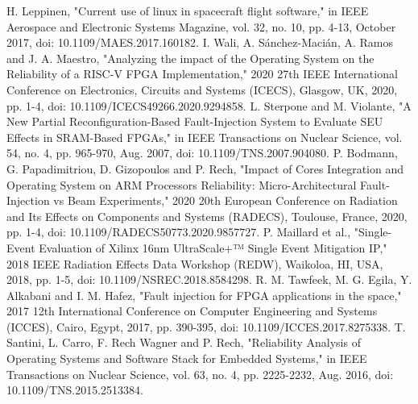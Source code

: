 \documentclass[conference]{IEEEtran}
\begin{document}
\begin{thebibliography}{10}
     H. Leppinen, "Current use of linux in spacecraft flight software," in IEEE Aerospace and Electronic Systems Magazine,
    vol. 32, no. 10, pp. 4-13, October 2017, doi: 10.1109/MAES.2017.160182. 
     I. Wali, A. Sánchez-Macián, A. Ramos and J. A. Maestro, "Analyzing the impact of the Operating System on the Reliability
    of a RISC-V FPGA Implementation," 2020 27th IEEE International Conference on Electronics, Circuits and Systems (ICECS), Glasgow, UK, 2020,
    pp. 1-4, doi: 10.1109/ICECS49266.2020.9294858.
     L. Sterpone and M. Violante, "A New Partial Reconfiguration-Based Fault-Injection System to Evaluate SEU Effects in SRAM-Based
    FPGAs," in IEEE Transactions on Nuclear Science, vol. 54, no. 4, pp. 965-970, Aug. 2007, doi: 10.1109/TNS.2007.904080.
     P. Bodmann, G. Papadimitriou, D. Gizopoulos and P. Rech, "Impact of Cores Integration and Operating System on ARM Processors 
    Reliability: Micro-Architectural Fault-Injection vs Beam Experiments," 2020 20th European Conference on Radiation and Its Effects on 
    Components and Systems (RADECS), Toulouse, France, 2020, pp. 1-4, doi: 10.1109/RADECS50773.2020.9857727.
     P. Maillard et al., "Single-Event Evaluation of Xilinx 16nm UltraScale+™ Single Event Mitigation IP," 2018 IEEE Radiation 
    Effects Data Workshop (REDW), Waikoloa, HI, USA, 2018, pp. 1-5, doi: 10.1109/NSREC.2018.8584298.
     R. M. Tawfeek, M. G. Egila, Y. Alkabani and I. M. Hafez, "Fault injection for FPGA applications in the space," 2017 12th
    International Conference on Computer Engineering and Systems (ICCES), Cairo, Egypt, 2017, pp. 390-395, doi: 10.1109/ICCES.2017.8275338.
     T. Santini, L. Carro, F. Rech Wagner and P. Rech, "Reliability Analysis of Operating Systems and Software Stack for Embedded 
    Systems," in IEEE Transactions on Nuclear Science, vol. 63, no. 4, pp. 2225-2232, Aug. 2016, doi: 10.1109/TNS.2015.2513384.
\end{thebibliography}
\end{document}
